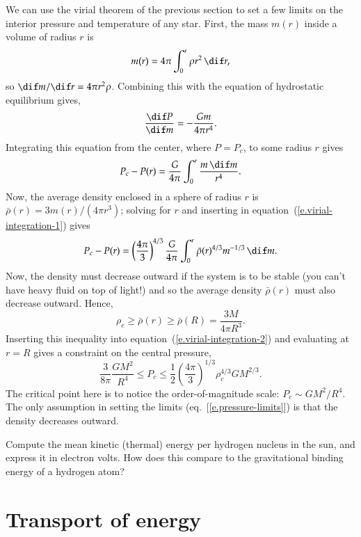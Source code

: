 We can use the virial theorem of the previous section to set a few limits on the interior pressure and temperature of any star.  First, the mass $m(r)$ inside a volume of radius $r$ is
\[ m(r) = 4\pi\int_{0}^{r} \rho r^{2}\,\dif r, \]
so $\dif m/\dif r = 4\pi r^{2}\rho$. Combining this with the equation of hydrostatic equilibrium gives,
\[
\frac{\dif P}{\dif m} = -\frac{G m}{4\pi r^{4}}.
\]
Integrating this equation from the center, where $P = P_{c}$, to some radius $r$ gives
\begin{equation}\label{e.virial-integration-1}
P_{c} - P(r) = \frac{G}{4\pi}\int_{0}^{r} \frac{m \,\dif m}{r^{4}}.
\end{equation}
Now, the average density enclosed in a sphere of radius $r$ is $\bar{\rho}(r) = 3m(r)/(4\pi r^{3})$; solving for $r$ and inserting in equation~(\ref{e.virial-integration-1}) gives
\begin{equation}\label{e.virial-integration-2}
P_{c} - P(r) = \left(\frac{4\pi}{3}\right)^{4/3} \frac{G}{4\pi}\int_{0}^{r} \bar{\rho}(r)^{4/3} m^{-1/3}\,\dif m.
\end{equation}
Now, the density must decrease outward if the system is to be stable (you can't have heavy fluid on top of light!) and so the average density $\bar{\rho}(r)$ must also decrease outward. Hence,
\[ \rho_{c} \ge \bar{\rho}(r) \ge \bar{\rho}(R) = \frac{3M}{4\pi R^{3}}.\]
Inserting this inequality into equation~(\ref{e.virial-integration-2}) and evaluating at $r=R$ gives a constraint on the central pressure,
\begin{equation}\label{e.pressure-limits}
\frac{3}{8\pi} \frac{GM^{2}}{R^{4}} \le P_{c} \le \frac{1}{2} \left(\frac{4\pi}{3}\right)^{1/3} \rho_{c}^{4/3}G M^{2/3}.
\end{equation}
The critical point here is to notice the order-of-magnitude scale: $P_{c}\sim GM^{2}/R^{4}$. The only assumption in setting the limits (eq.~[\ref{e.pressure-limits}]) is that the density decreases outward.

\begin{exercisebox}
Compute the mean kinetic (thermal) energy per hydrogen nucleus in the sun, and express it in electron volts. How does this compare to the gravitational binding energy of a hydrogen atom?
\end{exercisebox}

\section{Transport of energy}\label{s.energy-transport-estimate}

